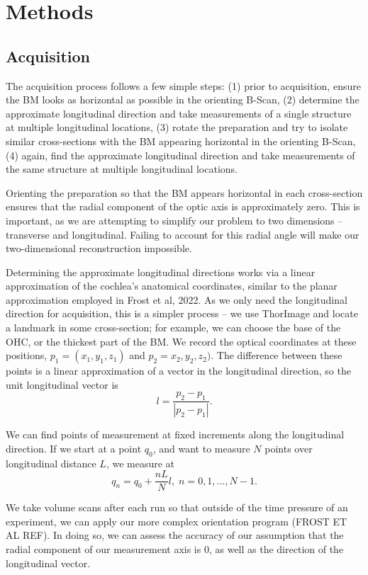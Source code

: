 \documentclass[aip,cp,amsmath,amssymb,reprint]{revtex4-2}
\begin{document}
\section{\label{sec:methods}Methods}

\subsection{\label{sec:acquisition}Acquisition}
\par{The acquisition process follows a few simple steps: (1) prior to acquisition, ensure the BM looks as horizontal as possible in the orienting B-Scan, (2) determine the approximate longitudinal direction and take measurements of a single structure at multiple longitudinal locations, (3) rotate the preparation and try to isolate similar cross-sections with the BM appearing horizontal in the orienting B-Scan, (4) again, find the approximate longitudinal direction and take measurements of the same structure at multiple longitudinal locations.}
\par{Orienting the preparation so that the BM appears horizontal in each cross-section ensures that the radial component of the optic axis is approximately zero. This is important, as we are attempting to simplify our problem to two dimensions – transverse and longitudinal. Failing to account for this radial angle will make our two-dimensional reconstruction impossible.}
\par{Determining the approximate longitudinal directions works via a linear approximation of the cochlea’s anatomical coordinates, similar to the planar approximation employed in Frost et al, 2022. As we only need the longitudinal direction for acquisition, this is a simpler process – we use ThorImage and locate a landmark in some cross-section; for example, we can choose the base of the OHC, or the thickest part of the BM. We record the optical coordinates at these positions, $p_1 = (x_1,y_1,z_1)$ and $p_2 = x_2, y_2, z_2)$. The difference between these points is a linear approximation of a vector in the longitudinal direction, so the unit longitudinal vector is
	\begin{equation}
		\label{eqn:lunit}
		l = \frac{p_2-p_1}{|p_2-p_1|}.
	\end{equation}
}
\par{We can find points of measurement at fixed increments along the longitudinal direction. If we start at a point $q_0$, and want to measure $N$ points over longitudinal distance $L$, we measure at 
	\begin{equation}
		\label{eqn:points}
		q_n = q_0 + \frac{nL}{N}l,\;n=0,1,\ldots,N-1.
	\end{equation}
}
\par{We take volume scans after each run so that outside of the time pressure of an experiment, we can apply our more complex orientation program (FROST ET AL REF). In doing so, we can assess the accuracy of our assumption that the radial component of our measurement axis is 0, as well as the direction of the longitudinal vector.}
\end{document}
